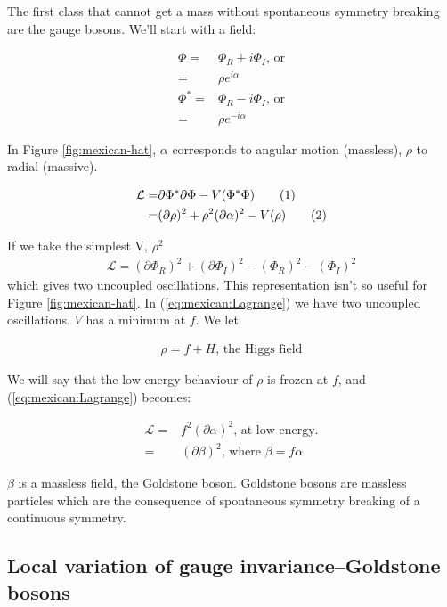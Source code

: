 \documentclass[]{article}
\newcommand\numberthis{\addtocounter{equation}{1}\tag{\theequation}}
\begin{document}
The first class that cannot get a mass without spontaneous symmetry breaking are the gauge bosons. We'll start with a field:

\begin{align*}
	\Phi =& \Phi_R + i \Phi_I \text{, or}\\
	=& \rho e^{i \alpha}\\
	\Phi^* =& \Phi_R - i \Phi_I \text{, or}\\
	=& \rho e^{-i \alpha}
\end{align*}

In Figure \ref{fig:mexican-hat}, $\alpha$ corresponds to angular motion (massless), $\rho$  to radial (massive).

\begin{align*}
	\mathcal{L} =& \partial \Phi^* \partial \Phi - V(\Phi^*\Phi)  \numberthis \label{eq:mexican:LagrangeRI}\\
	=& (\partial \rho)^2 + \rho^2 (\partial \alpha)^2 - V(\rho) \numberthis \label{eq:mexican:Lagrange}
\end{align*} 

If we take the simplest V, $\rho^2$
\begin{align*}
	\mathcal{L} = (\partial \Phi_R)^2 +  (\partial \Phi_I)^2 -(\Phi_R)^2  -(\Phi_I)^2
\end{align*}
which gives two uncoupled oscillations. This representation isn't so useful for Figure \ref{fig:mexican-hat}. In (\ref{eq:mexican:Lagrange}) we have two uncoupled oscillations. $V$ has a minimum at $f$. We let

\begin{align*}
	\rho = f + H \text{, the Higgs field}
\end{align*}

We will say that the low energy behaviour of $\rho$ is frozen at $f$, and (\ref{eq:mexican:Lagrange}) becomes:

\begin{align*}
	\mathcal{L} =& f^2(\partial \alpha)^2 \text{, at low energy.}\\
	=& (\partial \beta)^2 \text{, where $\beta = f \alpha$}
\end{align*}

$\beta$ is a massless field, the Goldstone boson. Goldstone bosons are massless particles which are the consequence of spontaneous symmetry breaking of a continuous symmetry.

\subsection{Local variation of gauge invariance--Goldstone bosons}
\end{document}
